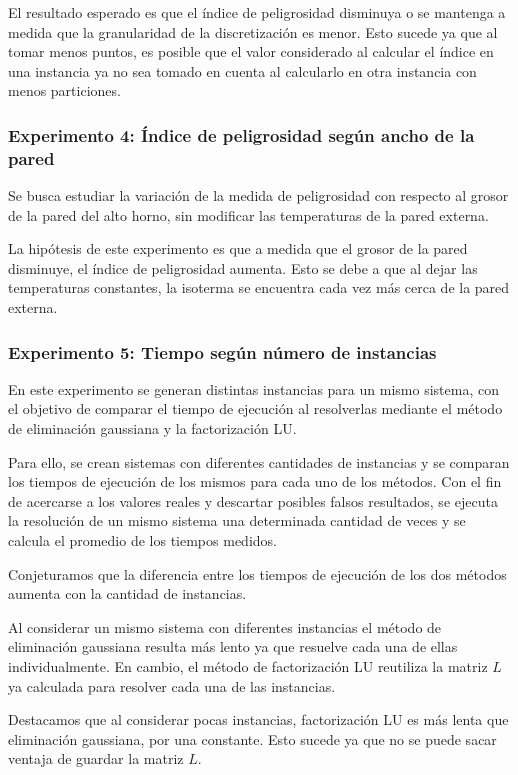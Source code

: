       El resultado esperado es que el índice de peligrosidad disminuya o se mantenga a medida que la granularidad de la discretización es menor. Esto sucede ya que al tomar menos puntos, es posible que el valor considerado al calcular el índice en una instancia ya no sea tomado en cuenta al calcularlo en otra instancia con menos particiones.

    \subsubsection*{Experimento 4: Índice de peligrosidad según ancho de la pared}
      Se busca estudiar la variación de la medida de peligrosidad con respecto al grosor de la pared del alto horno, sin modificar las temperaturas de la pared externa.

      La hipótesis de este experimento es que a medida que el grosor de la pared disminuye, el índice de peligrosidad aumenta. Esto se debe a que al dejar las temperaturas constantes, la isoterma se encuentra cada vez más cerca de la pared externa.

    \subsubsection*{Experimento 5: Tiempo según número de instancias}
      En este experimento se generan distintas instancias para un mismo sistema, con el objetivo de comparar el tiempo de ejecución al resolverlas mediante el método de eliminación gaussiana y la factorización LU. 

      Para ello, se crean sistemas con diferentes cantidades de instancias y se comparan los tiempos de ejecución de los mismos para cada uno de los métodos. Con el fin de acercarse a los valores reales y descartar posibles falsos resultados, se ejecuta la resolución de un mismo sistema una determinada cantidad de veces y se calcula el promedio de los tiempos medidos.

      Conjeturamos que la diferencia entre los tiempos de ejecución de los dos métodos aumenta con la cantidad de instancias. 

      Al considerar un mismo sistema con diferentes instancias el método de eliminación gaussiana resulta más lento ya que resuelve cada una de ellas individualmente. En cambio, el método de factorización LU reutiliza la matriz $L$ ya calculada para resolver cada una de las instancias.

      Destacamos que al considerar pocas instancias, factorización LU es más lenta que eliminación gaussiana, por una constante. Esto sucede ya que no se puede sacar ventaja de guardar la matriz $L$.

